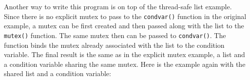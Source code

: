
Another way to write this program is on top of the thread-safe list example.
Since there is no explicit mutex to pass to the \texttt{condvar()} function in
the original example, a mutex can be first created and then passed along with
the list to the \texttt{mutex()} function. The same mutex then can be passed to
\texttt{condvar()}. The function binds the mutex already associated with the
list to the condition variable. The final result is the same as in the explicit
mutex example, a list and a condition variable sharing the same mutex. Here is
the example again with the shared list and a condition variable:


